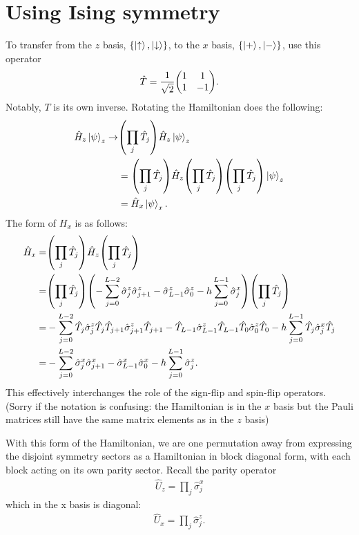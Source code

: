 \documentclass{article}
\begin{document}
\newpage

\section{
Using Ising symmetry
}

To transfer from the $z$ basis, $\{\ket{\uparrow}, \ket{\downarrow} \}$,
to the $x$ basis, $\{\ket{+}, \ket{-}\}$, use this operator
\begin{align}
    \hat T = \frac{1}{\sqrt{2}} \mqty( 1 & 1 \\ 1 & -1 ).
\end{align}
Notably, $T$ is its own inverse. 
Rotating the Hamiltonian does the following:
\begin{align}
    \hat H_z \ket{\psi}_z
        \to& \qty( \prod_j \hat T_j ) \hat H_z \ket{\psi}_z
    \\
    &= \qty( \prod_j \hat T_j ) \hat H_z \qty( \prod_j \hat T_j )
        \qty( \prod_j \hat T_j ) \ket{\psi}_z 
    \\
    &= \hat H_x \ket{\psi}_x.
\end{align}
The form of $H_x$ is as follows:
\begin{align}
    \hat H_x =& \qty( \prod_j \hat T_j ) \hat H_z \qty( \prod_j \hat T_j )
    \\
    =& \qty( \prod_j \hat T_j )
        \qty( -\sum_{j=0}^{L-2} \hat \sigma^z_{j} \hat \sigma^z_{j+1} 
            - \hat \sigma^z_{L-1} \hat \sigma^z_{0}
            -h \sum_{j=0}^{L-1} \hat \sigma^x_{j})
        \qty( \prod_j \hat T_j )
    \\
    =& -\sum_{j=0}^{L-2} \hat T_j \hat \sigma^z_{j} \hat T_j
                        \hat T_{j+1} \hat \sigma^z_{j+1} \hat T_{j+1}
        - \hat T_{L-1} \hat \sigma^z_{L-1} \hat T_{L-1} 
             \hat T_{0}  \hat \sigma^z_{0} \hat T_{0} 
        -h \sum_{j=0}^{L-1}  \hat T_{j} \hat \sigma^x_{j} \hat T_{j}
    \\
    =& -\sum_{j=0}^{L-2} \hat \sigma^x_{j} \hat \sigma^x_{j+1}
        - \hat \sigma^x_{L-1} \hat \sigma^x_{0} 
        -h \sum_{j=0}^{L-1}  \hat \sigma^z_{j}.
\end{align}
This effectively interchanges the role of the sign-flip and spin-flip operators.
(Sorry if the notation is confusing: the Hamiltonian is in the $x$ basis but
the Pauli matrices still have the same matrix elements as in the $z$ basis)

With this form of the Hamiltonian, we are one permutation away from expressing
the disjoint symmetry sectors as a Hamiltonian in block diagonal form, with each
block acting on its own parity sector.
Recall the parity operator 
\begin{align}
    \hat U_z = \prod_j \hat \sigma_{j}^x
\end{align}
which in the x basis is diagonal:
\begin{align}
    \hat U_x = \prod_j \hat \sigma_{j}^z.
\end{align}
\end{document}
